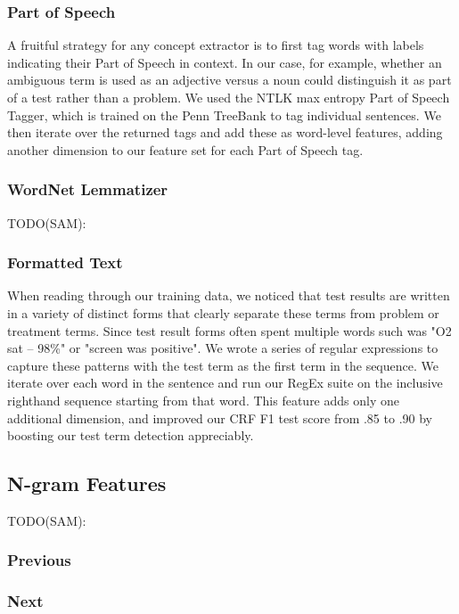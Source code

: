 \documentclass[preprint]{style}
\begin{document}
\subsubsection{Part of Speech}
A fruitful strategy for any concept extractor is to first tag words with labels indicating their Part of Speech in context. In our case, for example, whether an ambiguous term is used as an adjective versus a noun could distinguish it as part of a test rather than a problem. We used the NTLK max entropy Part of Speech Tagger, which is trained on the Penn TreeBank to tag individual sentences. We then iterate over the returned tags and add these as word-level features, adding another dimension to our feature set for each Part of Speech tag.

\subsubsection{WordNet Lemmatizer}
TODO(SAM):

\subsubsection{Formatted Text}
When reading through our training data, we noticed that test results are written in a variety of distinct forms that clearly separate these terms from problem or treatment terms. Since test result forms often spent multiple words such was "O2 sat -- 98\%" or "screen was positive". We wrote a series of regular expressions to capture these patterns with the test term as the first term in the sequence. We iterate over each word in the sentence and run our RegEx suite on the inclusive righthand sequence starting from that word. This feature adds only one additional dimension, and improved our CRF F1 test score from .85 to .90 by boosting our test term detection appreciably.

\subsection{N-gram Features}
TODO(SAM):

\subsubsection{Previous}

\subsubsection{Next}
\end{document}
